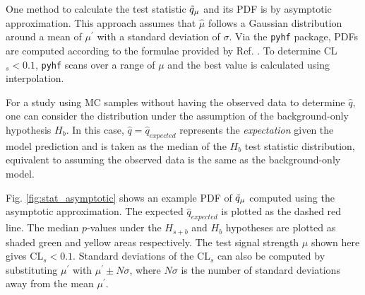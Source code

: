 
One method to calculate the test statistic $\Tilde{q}_\mu$ and its PDF is by asymptotic approximation.
This approach assumes that $\hat{\mu}$ follows a Gaussian distribution around a mean of $\mu^{\prime}$ with a standard deviation of $\sigma$.
Via the \texttt{pyhf} package, PDFs are computed according to the formulae provided by Ref. \cite{asymptotic_test}.
To determine CL$_s < 0.1$, \texttt{pyhf} scans over a range of $\mu$ and the best value is calculated using interpolation.

For a study using MC samples without having the observed data to determine $\hat{q}$, one can consider the distribution under the assumption of the background-only hypothesis $H_b$.
In this case, $\hat{q} = \hat{q}_{expected}$ represents the \textit{expectation} given the model prediction and is taken as the median of the $H_b$ test statistic distribution, equivalent to assuming the observed data is the same as the background-only model. 

Fig. \ref{fig:stat_asymptotic} shows an example PDF of $\Tilde{q}_\mu$ computed using the asymptotic approximation.
The expected $\hat{q}_{expected}$ is plotted as the dashed red line. 
The median $p$-values under the $H_{s+b}$ and $H_b$ hypotheses are plotted as shaded green and yellow areas respectively.
The test signal strength $\mu$ shown here gives CL$_s < 0.1$.
Standard deviations of the CL$_s$ can also be computed by substituting $\mu^\prime$ with $\mu^{\prime} \pm N\sigma$, where $N\sigma$ is the number of standard deviations away from the mean $\mu^{\prime}$. 


